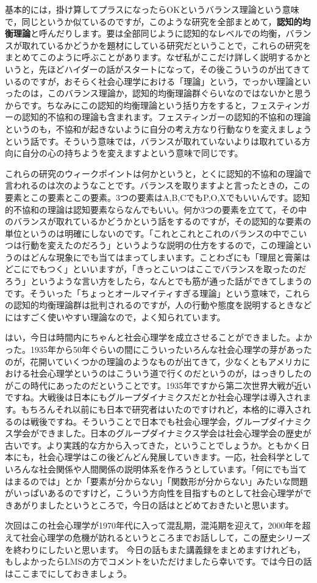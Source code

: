 \documentclass{ltjsbook}
\begin{document}
基本的には，掛け算してプラスになったらOKというバランス理論という意味で，同じというか似ているのですが，このような研究を全部まとめて，\textbf{認知的均衡理論}と呼んだりします。要は全部同じように認知的なレベルでの均衡，バランスが取れているかどうかを題材にしている研究だということで，これらの研究をまとめてこのように呼ぶことがあります。なぜ私がここだけ詳しく説明するかというと，先ほどハイダーの話がスタートになって，その後こういうのが出てきているのですが，おそらく社会心理学における「理論」という，でっかい理論といったのは，このバランス理論か，認知的均衡理論群ぐらいなのではないかと思うからです。ちなみにこの認知的均衡理論という括り方をすると，フェスティンガーの認知的不協和の理論も含まれます。フェスティンガーの認知的不協和の理論というのも，不協和が起きないように自分の考え方なり行動なりを変えましょうという話です。そういう意味では，バランスが取れていないよりは取れている方向に自分の心の持ちようを変えますよという意味で同じです。

これらの研究のウィークポイントは何かというと，とくに認知的不協和の理論で言われるのは次のようなことです。バランスを取りますよと言ったときの，この要素とこの要素とこの要素。3つの要素はA,B,CでもP,O,Xでもいいんです。認知的不協和の理論は認知要素ならなんでもいい。何か3つの要素を立てて，その中のバランスが取れているかどうかという話をするのですが，その認知的な要素の単位というのは明確にしないのです。「これとこれとこれのバランスの中でこいつは行動を変えたのだろう」というような説明の仕方をするので，この理論というのはどんな現象にでも当てはまってしまいます。ことわざにも「理屈と膏薬はどこにでもつく」といいますが，「きっとこいつはここでバランスを取ったのだろう」というような言い方をしたら，なんとでも筋が通った話ができてしまうのです。そういった「ちょっとオールマイティすぎる理論」という意味で，これらの認知的均衡理論群は批判されるのですが，人の行動や態度を説明するときなどにはすごく使いやすい理論なので，よく知られています。

\vspace{2cm}

はい，今日は時間内にちゃんと社会心理学を成立させることができました。よかった。1935年から50年ぐらいの間にこういったいろんな社会心理学の芽があったのが，花開いていくつかの理論のようなものが出てきて，少なくともアメリカにおける社会心理学というのはこういう道で行くのだというのが，はっきりしたのがこの時代にあったのだということです。1935年ですから第二次世界大戦が近いですね。大戦後は日本にもグループダイナミクスだとか社会心理学は導入されます。もちろんそれ以前にも日本で研究者はいたのですけれど，本格的に導入されるのは戦後ですね。そういうことで日本でも社会心理学会，グループダイナミクス学会ができました。日本のグループダイナミクス学会は社会心理学会の歴史が古いです。より実践的な方から入ってきた，ということでしょうか。ともかく日本にも，社会心理学はこの後どんどん発展していきます。一応，社会科学としていろんな社会関係や人間関係の説明体系を作ろうとしています。「何にでも当てはまるのでは」とか「要素が分からない」「関数形が分からない」みたいな問題がいっぱいあるのですけど，こういう方向性を目指すものとして社会心理学ができあがりましたというところで，今日の話はとどめておきたいと思います。


次回はこの社会心理学が1970年代に入って混乱期，混沌期を迎えて，2000年を超えて社会心理学の危機が訪れるというところまでお話しして，この歴史シリーズを終わりにしたいと思います。
今日の話もまた講義録をまとめますけれども，もしよかったらLMSの方でコメントをいただけましたら幸いです。では今日の話はここまでにしておきましょう。

\printbibliography[title=引用文献]
\end{document}
